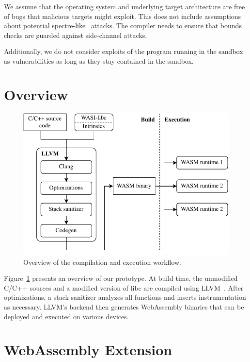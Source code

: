\noindent
We assume that the operating system and underlying target architecture are free of bugs that malicious targets might exploit.
This does not include assumptions about potential spectre-like~\cite{kocher2020spectre} attacks.
The compiler needs to ensure that bounds checks are guarded against side-channel attacks.

Additionally, we do not consider exploits of the program running in the sandbox as vulnerabilities as long as they stay contained in the sandbox.

\section{Overview}
\label{sec:overview}

\begin{figure}[t]
    \centering
    \includegraphics{figures/build/overview}
    \caption{Overview of the compilation and execution workflow.}
    \label{fig:overview}
\end{figure}

Figure~\ref{fig:overview} presents an overview of our prototype.
At build time, the unmodified C/C++ sources and a modified version of libc are compiled using LLVM~\cite{lattner2004llvm}.
After optimizations, a stack sanitizer analyzes all functions and inserts instrumentation as necessary.
LLVM's backend then generates WebAssembly binaries that can be deployed and executed on various devices.

\section{WebAssembly Extension}
\label{sec:wasm-extension}

